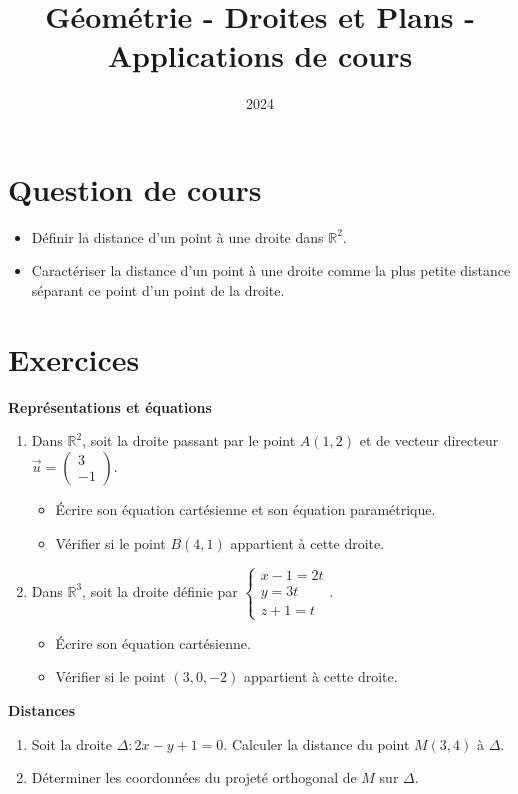 \documentclass[10pt,a4paper]{article}
\title{Géométrie - Droites et Plans - Applications de cours}
\author{}
\date{2024}
\begin{document}
\maketitle

\section*{Question de cours}
\begin{itemize}
    \item Définir la distance d'un point à une droite dans $\mathbb{R}^2$.
    \item Caractériser la distance d'un point à une droite comme la plus petite distance séparant ce point d'un point de la droite.
\end{itemize}

\section*{Exercices}

\textbf{Représentations et équations}
\begin{enumerate}
    \item Dans $\mathbb{R}^2$, soit la droite passant par le point $A(1, 2)$ et de vecteur directeur $\vec{u} = \begin{pmatrix} 3 \\ -1 \end{pmatrix}$.
    \begin{itemize}
        \item Écrire son équation cartésienne et son équation paramétrique.
        \item Vérifier si le point $B(4, 1)$ appartient à cette droite.
    \end{itemize}
    \item Dans $\mathbb{R}^3$, soit la droite définie par $\begin{cases} x - 1 = 2t \\ y = 3t \\ z + 1 = t \end{cases}$.
    \begin{itemize}
        \item Écrire son équation cartésienne.
        \item Vérifier si le point $(3, 0, -2)$ appartient à cette droite.
    \end{itemize}
\end{enumerate}

\textbf{Distances}
\begin{enumerate}
    \item Soit la droite $\Delta : 2x - y + 1 = 0$. Calculer la distance du point $M(3, 4)$ à $\Delta$.
    \item Déterminer les coordonnées du projeté orthogonal de $M$ sur $\Delta$.
\end{enumerate}
\end{document}
